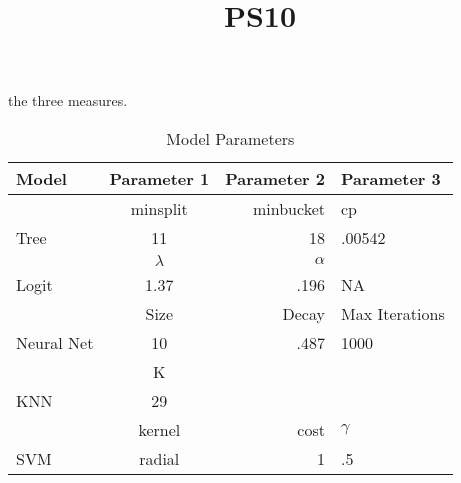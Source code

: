 \documentclass{article} \usepackage[utf8]{inputenc} \title{PS10}
\begin{document}
the three measures. \begin{table}[h!]
  \begin{center}
    \caption{Model Parameters}
    \label{tab:table1}
    \begin{tabular}{l|c|r|l}
      \textbf{Model} & \textbf{Parameter 1} & \textbf{Parameter 2} & 
\textbf{Parameter 3}\\
      \hline
      & minsplit & minbucket & cp\\
      Tree & 11 & 18 & .00542\\
      \hline
      &$\lambda$ & $\alpha$ &\\
      Logit & 1.37 & .196 & NA\\
      \hline
      & Size & Decay & Max Iterations\\
      Neural Net & 10 & .487 & 1000\\
      \hline
      & K & &\\
      KNN & 29 & &\\
      \hline
      & kernel & cost & $\gamma$\\
      SVM & radial & 1 & .5
    \end{tabular}
  \end{center} \end{table}
\end{document}
